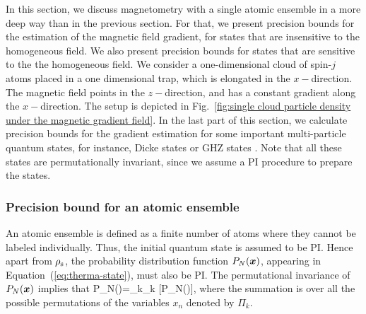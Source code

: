 In this section, we discuss magnetometry with a single
atomic ensemble in a more deep way than in the previous section.
For that, we present precision bounds for
the estimation of the magnetic field gradient, for
states that are insensitive to the homogeneous field.
We also present precision bounds for states that are sensitive to the
the homogeneous field.
We consider a one-dimensional cloud of spin-$j$ atoms
placed in a one dimensional trap, which is elongated
in the  $x-$direction.
The magnetic field points in the  $z-$direction,
and has a constant gradient along the $x-$direction.
The setup is depicted
in Fig.~\ref{fig:single cloud particle density under the magnetic gradient field}.
In the last part of this section, we calculate precision bounds for the
gradient estimation for some important multi-particle quantum states,
for instance, Dicke states \citep{} or
GHZ states \citep{Greenberger1990}.
Note that all these states are permutationally invariant, since we
assume a PI procedure to prepare the states.

\subsubsection{Precision bound for an atomic ensemble}

An atomic ensemble is defined as a finite number of atoms where
they cannot be labeled individually.
Thus, the initial quantum state is assumed to be PI.
Hence apart from $\rho_{\rm s}$, the probability distribution function
$P_N(\boldsymbol{x})$, appearing in Equation~(\ref{eq:therma-state}),
must also be PI.
The permutational invariance of $P_N(\boldsymbol{x})$ implies that
\be
\label{eq:pi-for-pdf}
P_N()=\sum_{k}\Pi_k [P_N()],
\ee
where the summation is over all the possible permutations
of the variables $x_n$ denoted by
$\Pi_k.$

